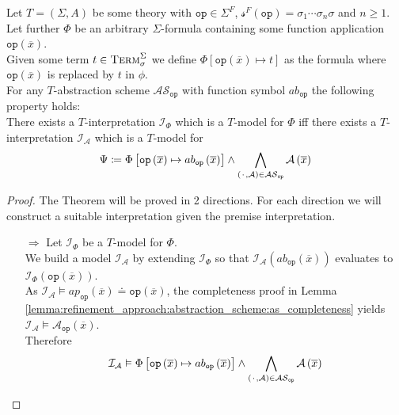 \begin{theorem}
\label{theorem:abstractions:scheme:equivalence}
Let $T=\left(\Sigma,A\right)$ be some theory with $\texttt{op}\in\Sigma^F$, $\mathcal{s}^F\left(\texttt{op}\right)=\sigma_1\dotsi\sigma_n\sigma$ and $n\geq1$.\\
Let further $\Phi$ be an arbitrary $\Sigma$-formula containing some function application $\texttt{op}\left(\overline{x}\right)$.\\
Given some term $t\in\textsc{Term}_\sigma^\Sigma$ we define $\Phi\left[\texttt{op}\left(\overline{x}\right)\mapsto t \right]$ as the formula where $\texttt{op}\left(\overline{x}\right)$ is replaced by $t$ in $\phi$.\\
For any $T$-abstraction scheme $\mathcal{AS}_{\texttt{op}}$ with function symbol $ab_{\texttt{op}}$ the following property holds:\\
There exists a $T$-interpretation $\mathcal{I}_{\Phi}$ which is a $T$-model for $\Phi$ iff there exists a $T$-interpretation $\mathcal{I}_{\mathcal{A}}$ which is a $T$-model for 
\[
\Psi \coloneqq \Phi\left[ \texttt{op}\left(\overline{x}\right) \mapsto ab_{\texttt{op}}\left(\overline{x}\right) \right] \land \bigwedge\limits_{\left({\mkern 2mu\cdot\mkern 2mu},\mathcal{A}\right)\in\mathcal{AS}_{\texttt{op}}} \mathcal{A}\left(\overline{x}\right)
\]
\begin{proof}
The Theorem will be proved in 2 directions. For each direction we will construct a suitable interpretation given the premise interpretation.
\begin{itemize}
    \item[$\Rightarrow$] Let $\mathcal{I}_{\Phi}$ be a $T$-model for $\Phi$.\\
        We build a model $\mathcal{I}_{\mathcal{A}}$ by extending $\mathcal{I}_{\Phi}$ so that $\mathcal{I}_\mathcal{A}\left(ab_{\texttt{op}}\left(\overline{x}\right)\right)$
        evaluates to $\mathcal{I}_{\Phi}\left(\texttt{op}\left(\overline{x}\right)\right)$.\\
        As $\mathcal{I}_{\mathcal{A}} \vDash ap_{\texttt{op}}\left(\overline{x}\right) \doteq \texttt{op}\left(\overline{x}\right)$,
        the completeness proof in Lemma \ref{lemma:refinement_approach:abstraction_scheme:as_completeness} yields\\
        $\mathcal{I}_{\mathcal{A}} \vDash \mathcal{A}_{\texttt{op}}\left(\overline{x}\right)$.\\
        Therefore 
        \[
            \mathcal{I}_{\mathcal{A}} \vDash\Phi\left[ \texttt{op}\left(\overline{x}\right) \mapsto ab_{\texttt{op}}\left(\overline{x}\right) \right] \land \bigwedge\limits_{\left({\mkern 2mu\cdot\mkern 2mu},\mathcal{A}\right)\in\mathcal{AS}_{\texttt{op}}} \mathcal{A}\left(\overline{x}\right)
\]
\end{itemize}
\end{proof}
\end{theorem}
